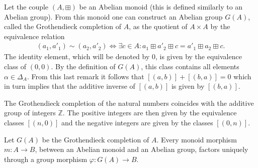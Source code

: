 
    \begin{construct}\label{group:grothendieck_completion}
        Let the couple $(A,\boxplus )$ be an Abelian monoid (this is defined similarly to an Abelian group). From this monoid one can construct an Abelian group $G(A)$, called the Grothendieck completion of $A$, as the quotient of $A\times A$ by the equivalence relation
        \begin{gather}
            (a_1,a'_1)\sim (a_2,a'_2) \iff \exists c\in A: a_1 \boxplus a'_2 \boxplus c = a'_1 \boxplus a_2 \boxplus c.
        \end{gather}
        The identity element, which will be denoted by 0, is given by the equivalence class of $(0,0)$. By the definition of $G(A)$, this class contains all elements $\alpha\in\Delta_A$. From this last remark it follows that $[(a,b)] + [(b,a)] = 0$ which in turn implies that the additive inverse of $[(a,b)]$ is given by $[(b,a)]$.
    \end{construct}

    \begin{example}
        The Grothendieck completion of the natural numbers coincides with the additive group of integers $\mathbb{Z}$. The positive integers are then given by the equivalence classes $[(n, 0)]$ and the negative integers are given by the classes $[(0, n)]$.
    \end{example}

    \begin{uproperty}
        Let $G(A)$ be the Grothendieck completion of $A$. Every monoid morphism $m:A\rightarrow B$, between an Abelian monoid and an Abelian group, factors uniquely through a group morphism $\varphi:G(A)\rightarrow B$.
    \end{uproperty}

